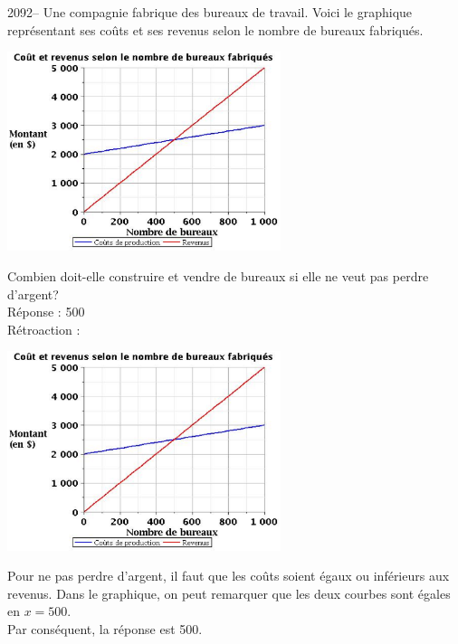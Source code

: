 \documentclass[letterpaper, 12pt]{article}
\begin{document}
2092-- Une compagnie fabrique des bureaux de travail. Voici le graphique repr\'esentant ses co\^uts et ses revenus selon le nombre de bureaux fabriqu\'es.
\begin{center}
 \includegraphics[width=8cm,bb=14 14 563 415]{Q2092v.eps}
\end{center}
Combien doit-elle construire et vendre de bureaux si elle ne veut pas perdre d'argent?\\

R\'eponse : 500\\

R\'etroaction :
\begin{center}
 \includegraphics[width=8cm,bb=14 14 563 415]{Q2092v.eps}
\end{center}
Pour ne pas perdre d'argent, il faut que les co\^uts soient \'egaux ou inf\'erieurs aux revenus. Dans le graphique, on peut remarquer que les deux courbes sont \'egales en $x=500$.\\
Par cons\'equent, la r\'eponse est 500.\\
\end{document}
